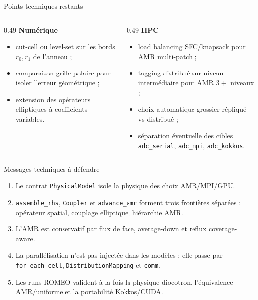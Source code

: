\documentclass[10pt,aspectratio=169]{beamer}
\newcommand{\code}[1]{\texttt{\footnotesize #1}}
\begin{document}
\begin{frame}{Points techniques restants}
  \begin{columns}[T,onlytextwidth]
    \begin{column}{0.49\textwidth}
      \textbf{Numérique}
      \begin{itemize}
        \item cut-cell ou level-set sur les bords \(r_0,r_1\) de l'anneau ;
        \item comparaison grille polaire pour isoler l'erreur géométrique ;
        \item extension des opérateurs elliptiques à coefficients variables.
      \end{itemize}
    \end{column}
    \begin{column}{0.49\textwidth}
      \textbf{HPC}
      \begin{itemize}
        \item load balancing SFC/knapsack pour AMR multi-patch ;
        \item tagging distribué sur niveau intermédiaire pour AMR \(3+\) niveaux ;
        \item choix automatique grossier répliqué vs distribué ;
        \item séparation éventuelle des cibles \code{adc\_serial}, \code{adc\_mpi}, \code{adc\_kokkos}.
      \end{itemize}
    \end{column}
  \end{columns}
\end{frame}

\begin{frame}{Messages techniques à défendre}
  \begin{enumerate}
    \item Le contrat \code{PhysicalModel} isole la physique des choix AMR/MPI/GPU.
    \item \code{assemble\_rhs}, \code{Coupler} et \code{advance\_amr} forment trois frontières séparées : opérateur spatial, couplage elliptique, hiérarchie AMR.
    \item L'AMR est conservatif par flux de face, average-down et reflux coverage-aware.
    \item La parallélisation n'est pas injectée dans les modèles : elle passe par \code{for\_each\_cell}, \code{DistributionMapping} et \code{comm}.
    \item Les runs ROMEO valident à la fois la physique diocotron, l'équivalence AMR/uniforme et la portabilité Kokkos/CUDA.
  \end{enumerate}
\end{frame}
\end{document}
